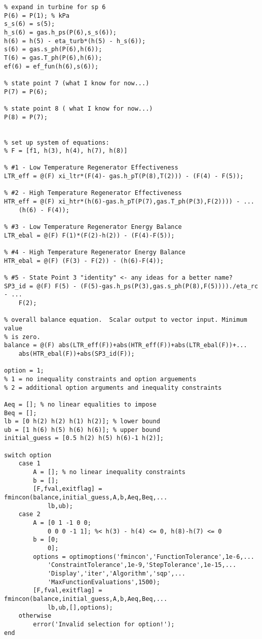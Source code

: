 \begin{fullwidth}
\begin{lstlisting}
% expand in turbine for sp 6
P(6) = P(1); % kPa
s_s(6) = s(5);
h_s(6) = gas.h_ps(P(6),s_s(6));
h(6) = h(5) - eta_turb*(h(5) - h_s(6));
s(6) = gas.s_ph(P(6),h(6));
T(6) = gas.T_ph(P(6),h(6));
ef(6) = ef_fun(h(6),s(6));

% state point 7 (what I know for now...)
P(7) = P(6);

% state point 8 ( what I know for now...)
P(8) = P(7);


% set up system of equations:
% F = [f1, h(3), h(4), h(7), h(8)]

% #1 - Low Temperature Regenerator Effectiveness
LTR_eff = @(F) xi_ltr*(F(4)- gas.h_pT(P(8),T(2))) - (F(4) - F(5));

% #2 - High Temperature Regenerator Effectiveness
HTR_eff = @(F) xi_htr*(h(6)-gas.h_pT(P(7),gas.T_ph(P(3),F(2)))) - ...
    (h(6) - F(4));

% #3 - Low Temperature Regenerator Energy Balance
LTR_ebal = @(F) F(1)*(F(2)-h(2)) - (F(4)-F(5));

% #4 - High Temperature Regenerator Energy Balance
HTR_ebal = @(F) (F(3) - F(2)) - (h(6)-F(4));

% #5 - State Point 3 "identity" <- any ideas for a better name?
SP3_id = @(F) F(5) - (F(5)-gas.h_ps(P(3),gas.s_ph(P(8),F(5))))./eta_rc - ...
    F(2);

% overall balance equation.  Scalar output to vector input. Minimum value
% is zero.
balance = @(F) abs(LTR_eff(F))+abs(HTR_eff(F))+abs(LTR_ebal(F))+...
    abs(HTR_ebal(F))+abs(SP3_id(F));

option = 1;
% 1 = no inequality constraints and option arguements
% 2 = additional option arguments and inequality constraints

Aeq = []; % no linear equalities to impose
Beq = [];
lb = [0 h(2) h(2) h(1) h(2)]; % lower bound
ub = [1 h(6) h(5) h(6) h(6)]; % upper bound
initial_guess = [0.5 h(2) h(5) h(6)-1 h(2)];

switch option
    case 1
        A = []; % no linear inequality constraints
        b = [];
        [F,fval,exitflag] = fmincon(balance,initial_guess,A,b,Aeq,Beq,...
            lb,ub);
    case 2
        A = [0 1 -1 0 0;
            0 0 0 -1 1]; %< h(3) - h(4) <= 0, h(8)-h(7) <= 0
        b = [0;
            0];
        options = optimoptions('fmincon','FunctionTolerance',1e-6,...
            'ConstraintTolerance',1e-9,'StepTolerance',1e-15,...
            'Display','iter','Algorithm','sqp',...
            'MaxFunctionEvaluations',1500);
        [F,fval,exitflag] = fmincon(balance,initial_guess,A,b,Aeq,Beq,...
            lb,ub,[],options);
    otherwise
        error('Invalid selection for option!');        
end


\end{lstlisting}
\end{fullwidth}
